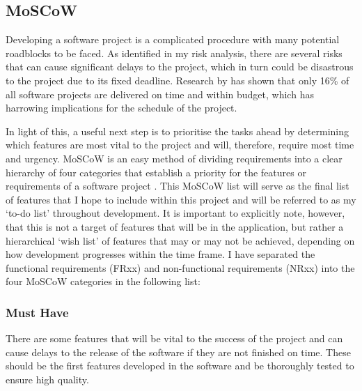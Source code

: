 \subsection{MoSCoW}
Developing a software project is a complicated procedure with many potential roadblocks to be faced.
As identified in my risk analysis, there are several risks that can cause significant delays to the project, which in turn could be disastrous to the project due to its fixed deadline.
Research by \cite{requirementsprioritization} has shown that only 16\% of all software projects are delivered on time and within budget, which has harrowing implications for the schedule of the project.

In light of this, a useful next step is to prioritise the tasks ahead by determining which features are most vital to the project and will, therefore, require most time and urgency.
MoSCoW is an easy method of dividing requirements into a clear hierarchy of four categories that establish a priority for the features or requirements of a software project \citep[p.517]{hatton2008choosing}.
This MoSCoW list will serve as the final list of features that I hope to include within this project and will be referred to as my `to-do list' throughout development. 
It is important to explicitly note, however, that this is not a target of features that will be in the application, but rather a hierarchical `wish list' of features that may or may not be achieved, depending on how development progresses within the time frame.
I have separated the functional requirements (FRxx) and non-functional requirements (NRxx) into the four MoSCoW categories in the following list:

\subsubsection{Must Have}
There are some features that will be vital to the success of the project and can cause delays to the release of the software if they are not finished on time.
These should be the first features developed in the software and be thoroughly tested to ensure high quality.

